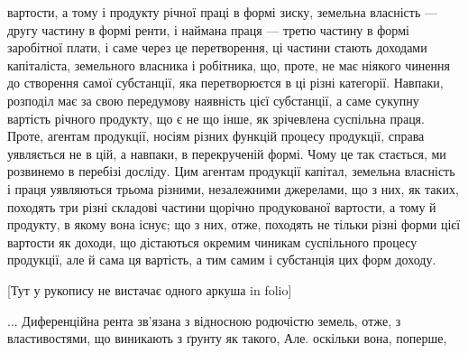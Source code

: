 вартости, а тому і продукту річної праці в формі зиску, земельна власність
— другу частину в формі ренти, і наймана праця — третю частину в формі
заробітної плати, і саме через це перетворення, ці частини стають доходами
капіталіста, земельного власника і робітника, що, проте, не має ніякого чинення
до створення самої субстанції, яка перетворюєтся в ці різні категорії. Навпаки,
розподіл має за свою передумову наявність цієї субстанції, а саме сукупну вартість
річного продукту, що є не що інше, як зрічевлена суспільна праця. Проте,
агентам продукції, носіям різних функцій процесу продукції, справа уявляється
не в цій, а навпаки, в перекрученій формі. Чому це так стається, ми розвинемо
в перебізі досліду. Цим агентам продукції капітал, земельна власність і
праця уявляються трьома різними, незалежними джерелами, що з них, як таких,
походять три різні складові частини щорічно продукованої вартости, а
тому й продукту, в якому вона існує; що з них, отже, походять не тільки різні
форми цієї вартости як доходи, що дістаються окремим чиникам суспільного процесу
продукції, але й сама ця вартість, а тим самим і субстанція цих форм
доходу.

[Тут у рукопису не вистачає одного аркуша in folio]

... Диференційна рента зв’язана з відносною родючістю земель, отже,
з властивостями, що виникають з ґрунту як такого, Але. оскільки вона, поперше,
\parbreak{}  %
